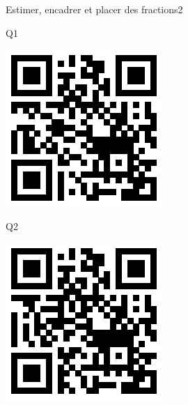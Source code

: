 \documentclass[a4paper,11pt]{report}
\begin{document}
\begin{qmoodle}{Estimer, encadrer et placer des fractions}{2}{
	\begin{center}
		Q1

		\includegraphics[scale=1]{img/no3fractions/eepdq/eepdq_1}
	\end{center}
	\begin{center}
		Q2

		\includegraphics[scale=1]{img/no3fractions/eepdq/eepdq_2}
	\end{center}
}
\end{qmoodle}
\end{document}

